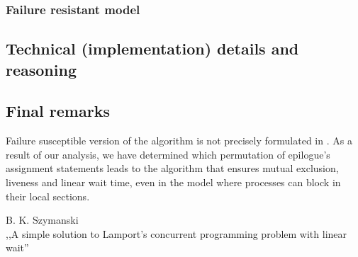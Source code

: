 
\subsubsection*{Failure resistant model}


\subsection*{Technical (implementation) details and reasoning}


\subsection*{Final remarks}

Failure susceptible version of the algorithm is not precisely formulated in \cite{Original}.
As a result of our analysis, we have determined which permutation of epilogue's assignment statements leads to the algorithm that ensures mutual exclusion, liveness and linear wait time, even in the model where processes can block in their local sections.


\begin{thebibliography}{9}
   B. K. Szymanski \\
    \newblock ,,A simple solution to Lamport's concurrent programming problem with linear wait''
\end{thebibliography}


